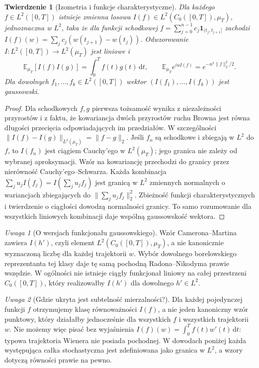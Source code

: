 \documentclass[11pt,a4paper,oneside]{report}
\numberwithin{equation}{chapter}
\theoremstyle{plain}
\newtheorem{twierdzenie}{Twierdzenie}[chapter]
\theoremstyle{definition}
\theoremstyle{remark}
\newtheorem{uwaga}{Uwaga}[chapter]
\newcommand{\E}{\mathbb{E}}
\newcommand{\ind}[1]{\mathbf{1}_{#1}}
\newcommand{\dd}{\mathrm{d}}
\begin{document}
\begin{twierdzenie}[Izometria i funkcje charakterystyczne]\label{thm:volIII:09:02}
\label{th:pw-map}
Dla każdego $f\in L^2([0,T])$ istnieje zmienna losowa
$I(f)\in L^2(C_0([0,T]),\mu_T)$, jednoznaczna w $L^2$,
taka że dla funkcji schodkowej
$f=\sum_{j=0}^{n-1}c_j\ind{(t_j,t_{j+1}]}$ zachodzi
$I(f)(w)=\sum_j c_j(w(t_{j+1})-w(t_j))$.
Odwzorowanie $I:L^2([0,T])\to L^2(\mu_T)$ jest liniowe i
\[
\E_{\mu_T}[I(f)I(g)]=\int_0^T f(t)g(t)\,\dd t,
\qquad
\E_{\mu_T}e^{iuI(f)}=e^{-u^2\|f\|_2^2/2}.
\]
Dla dowolnych $f_1,\ldots,f_k\in L^2([0,T])$ wektor
$(I(f_1),\ldots,I(f_k))$ jest gaussowski.
\end{twierdzenie}
\begin{proof}
Dla schodkowych $f,g$ pierwsza tożsamość wynika z niezależności
przyrostów i z faktu, że kowariancja dwóch przyrostów ruchu Browna
jest równa długości przecięcia odpowiadających im przedziałów.
W szczególności $\|I(f)-I(g)\|_{L^2(\mu_T)}=\|f-g\|_2$.
Jeśli $f_n$ są schodkowe i zbiegają w $L^2$ do $f$,
to $I(f_n)$ jest ciągiem Cauchy'ego w $L^2(\mu_T)$;
jego granica nie zależy od wybranej aproksymacji.
Wzór na kowariancję przechodzi do granicy przez nierówność
Cauchy'ego--Schwarza. Każda kombinacja
$\sum_j u_jI(f_j)=I(\sum_j u_jf_j)$ jest granicą w $L^2$
zmiennych normalnych o wariancjach zbiegających do
$\|\sum_j u_jf_j\|_2^2$. Zbieżność funkcji charakterystycznych
i twierdzenie o ciągłości dowodzą normalności granicy.
To samo rozumowanie dla wszystkich liniowych kombinacji
daje wspólną gaussowskość wektora.
\end{proof}

\begin{uwaga}[O wersjach funkcjonału gaussowskiego]
Wzór Camerona--Martina zawiera $I(h')$, czyli element
$L^2(C_0([0,T]),\mu_T)$, a nie kanonicznie wyznaczoną
liczbę dla każdej trajektorii $w$. Wybór dowolnego
borelowskiego reprezentanta tej klasy daje tę samą
pochodną Radona--Nikodyma prawie wszędzie. W ogólności
nie istnieje ciągły funkcjonał liniowy na całej
przestrzeni $C_0([0,T])$, który realizowałby $I(h')$
dla dowolnego $h'\in L^2$.
\end{uwaga}

\begin{uwaga}[Gdzie ukryta jest subtelność mierzalności?]
Dla każdej pojedynczej funkcji $f$ otrzymujemy klasę
równoważności $I(f)$, a nie jeden kanoniczny wzór punktowy,
który działałby jednocześnie dla wszystkich $f$ i wszystkich
trajektorii $w$. Nie możemy więc pisać bez wyjaśnienia
$I(f)(w)=\int_0^T f(t)w'(t)\,\dd t$: typowa trajektoria
Wienera nie posiada pochodnej. W dowodach poniżej każda
występująca całka stochastyczna jest zdefiniowana jako
granica w $L^2$, a wzory dotyczą równości prawie na pewno.
\end{uwaga}
\end{document}
